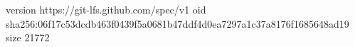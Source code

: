 version https://git-lfs.github.com/spec/v1
oid sha256:06f17c53dcdb463f0439f5a0681b47ddf4d0ea7297a1c37a8176f1685648ad19
size 21772
